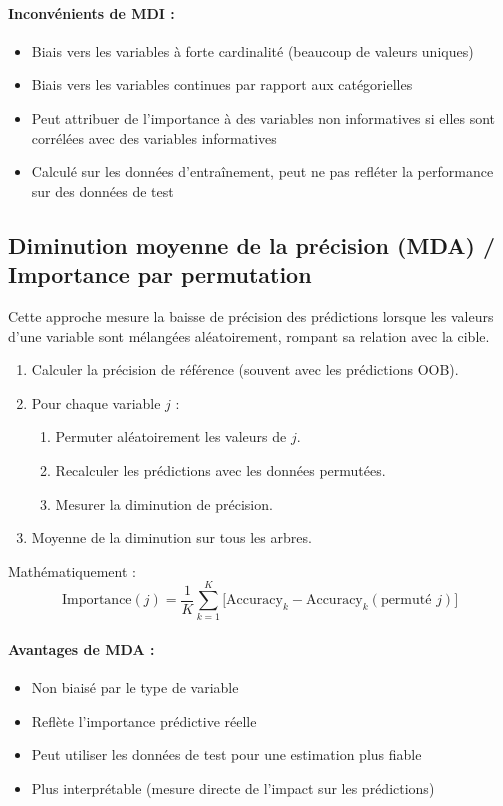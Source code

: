 \paragraph{Inconvénients de MDI :}
\begin{itemize}
    \item Biais vers les variables à forte cardinalité (beaucoup de valeurs uniques)
    \item Biais vers les variables continues par rapport aux catégorielles
    \item Peut attribuer de l’importance à des variables non informatives si elles sont corrélées avec des variables informatives
    \item Calculé sur les données d’entraînement, peut ne pas refléter la performance sur des données de test
\end{itemize}

\subsection{Diminution moyenne de la précision (MDA) / Importance par permutation}

Cette approche mesure la baisse de précision des prédictions lorsque les valeurs d’une variable sont mélangées aléatoirement, rompant sa relation avec la cible.

\begin{enumerate}
    \item Calculer la précision de référence (souvent avec les prédictions OOB).
    \item Pour chaque variable $j$ :
    \begin{enumerate}
        \item Permuter aléatoirement les valeurs de $j$.
        \item Recalculer les prédictions avec les données permutées.
        \item Mesurer la diminution de précision.
    \end{enumerate}
    \item Moyenne de la diminution sur tous les arbres.
\end{enumerate}

Mathématiquement :
\[
\text{Importance}(j) = \frac{1}{K} \sum_{k=1}^{K} \big[ \text{Accuracy}_k - \text{Accuracy}_k(\text{permuté } j) \big]
\]

\paragraph{Avantages de MDA :}
\begin{itemize}
    \item Non biaisé par le type de variable
    \item Reflète l’importance prédictive réelle
    \item Peut utiliser les données de test pour une estimation plus fiable
    \item Plus interprétable (mesure directe de l’impact sur les prédictions)
\end{itemize}

